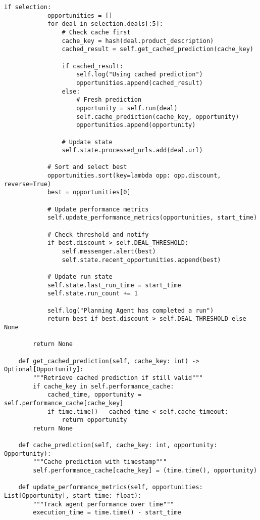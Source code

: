 \begin{lstlisting}[caption=Enhanced State Management System]
        if selection:
            opportunities = []
            for deal in selection.deals[:5]:
                # Check cache first
                cache_key = hash(deal.product_description)
                cached_result = self.get_cached_prediction(cache_key)
                
                if cached_result:
                    self.log("Using cached prediction")
                    opportunities.append(cached_result)
                else:
                    # Fresh prediction
                    opportunity = self.run(deal)
                    self.cache_prediction(cache_key, opportunity)
                    opportunities.append(opportunity)
                
                # Update state
                self.state.processed_urls.add(deal.url)
            
            # Sort and select best
            opportunities.sort(key=lambda opp: opp.discount, reverse=True)
            best = opportunities[0]
            
            # Update performance metrics
            self.update_performance_metrics(opportunities, start_time)
            
            # Check threshold and notify
            if best.discount > self.DEAL_THRESHOLD:
                self.messenger.alert(best)
                self.state.recent_opportunities.append(best)
                
            # Update run state
            self.state.last_run_time = start_time
            self.state.run_count += 1
            
            self.log("Planning Agent has completed a run")
            return best if best.discount > self.DEAL_THRESHOLD else None
            
        return None
    
    def get_cached_prediction(self, cache_key: int) -> Optional[Opportunity]:
        """Retrieve cached prediction if still valid"""
        if cache_key in self.performance_cache:
            cached_time, opportunity = self.performance_cache[cache_key]
            if time.time() - cached_time < self.cache_timeout:
                return opportunity
        return None
    
    def cache_prediction(self, cache_key: int, opportunity: Opportunity):
        """Cache prediction with timestamp"""
        self.performance_cache[cache_key] = (time.time(), opportunity)
    
    def update_performance_metrics(self, opportunities: List[Opportunity], start_time: float):
        """Track agent performance over time"""
        execution_time = time.time() - start_time
        

\end{lstlisting}
